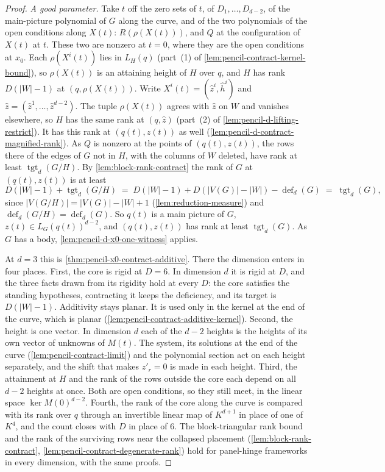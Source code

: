\begin{proof}
  \emph{A good parameter.} Take $t$ off the zero sets of $t$, of
  $D_1, \dots, D_{d-2}$, of the main-picture polynomial of $G$ along the
  curve, and of the two polynomials of the open conditions along $X(t)$:
  $R(\rho(X(t)))$, and $Q$ at the configuration of $X(t)$ at $t$. These
  two are nonzero at $t = 0$, where they are the open conditions at
  $x_0$. Each $\rho(X^i(t))$ lies in $L_H(q)$ (part~(1) of
  \cref{lem:pencil-contract-kernel-bound}), so $\rho(X(t))$ is an
  attaining height of $H$ over $q$, and $H$ has rank $D(|W| - 1)$ at
  $(q, \rho(X(t)))$. Write $X^i(t) = (\hat z^i, \hat h^i)$ and
  $\hat z = (\hat z^1, \dots, \hat z^{d-2})$. The tuple $\rho(X(t))$
  agrees with $\hat z$ on $W$ and vanishes elsewhere, so $H$ has the same
  rank at $(q, \hat z)$ (part~(2) of \cref{lem:pencil-d-lifting-restrict}).
  It has this rank at $(q(t), z(t))$ as well
  (\cref{lem:pencil-d-contract-magnified-rank}). As $Q$ is nonzero at the
  points of $(q(t), z(t))$, the rows there of the edges of $G$ not in
  $H$, with the columns of $W$ deleted, have rank at least
  $\operatorname{tgt}_d(G/H)$. By \cref{lem:block-rank-contract} the rank
  of $G$ at $(q(t), z(t))$ is at least
  \[
    D(|W| - 1) + \operatorname{tgt}_d(G/H) \;=\;
    D(|W| - 1) + D(|V(G)| - |W|) - \operatorname{def}_d(G) \;=\;
    \operatorname{tgt}_d(G),
  \]
  since $|V(G/H)| = |V(G)| - |W| + 1$ (\cref{lem:reduction-measure}) and
  $\operatorname{def}_d(G/H) = \operatorname{def}_d(G)$. So $q(t)$ is a
  main picture of $G$, $z(t) \in L_G(q(t))^{d-2}$, and $(q(t), z(t))$ has
  rank at least $\operatorname{tgt}_d(G)$. As $G$ has a body,
  \cref{lem:pencil-d-x0-one-witness} applies.

  At $d = 3$ this is \cref{thm:pencil-x0-contract-additive}. There the
  dimension enters in four places. First, the core is rigid at $D = 6$.
  In dimension $d$ it is rigid at $D$, and the three facts drawn from its
  rigidity hold at every $D$: the core satisfies the standing hypotheses,
  contracting it keeps the deficiency, and its target is $D(|W| - 1)$.
  Additivity stays planar. It is used only in the kernel at the end of
  the curve, which is planar (\cref{lem:pencil-contract-additive-kernel}).
  Second, the height is one vector. In dimension $d$ each of the $d - 2$
  heights is the heights of its own vector of unknowns of $M(t)$. The
  system, its solutions at the end of the curve
  (\cref{lem:pencil-contract-limit}) and the polynomial section act on
  each height separately, and the shift that makes $z'_r = 0$ is made in
  each height. Third, the attainment at $H$ and the rank of the rows
  outside the core each depend on all $d - 2$ heights at once. Both are
  open conditions, so they still meet, in the linear space
  $\ker M(0)^{d-2}$. Fourth, the rank of the core along the curve is
  compared with its rank over $q$ through an invertible linear map of
  $K^{d+1}$ in place of one of $K^4$, and the count closes with $D$ in
  place of $6$. The block-triangular rank bound and the rank of the
  surviving rows near the collapsed placement
  (\cref{lem:block-rank-contract},
  \cref{lem:pencil-contract-degenerate-rank}) hold for panel-hinge
  frameworks in every dimension, with the same proofs.
\end{proof}

